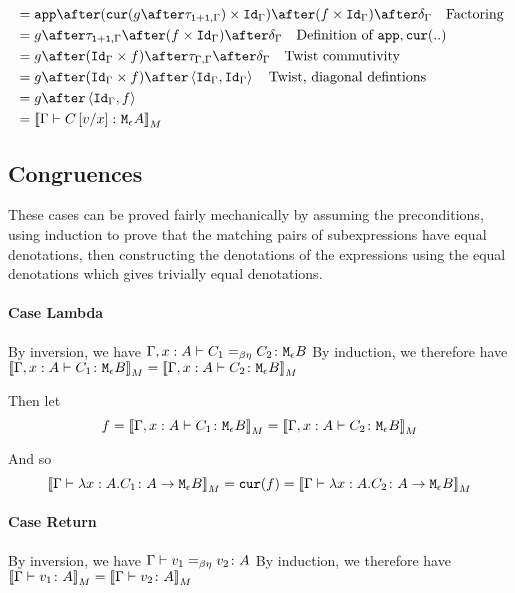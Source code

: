 {\begin{align}
            & = \app\after(\cur{g\after\twist{\1+\1}{\G}}\times \idg)\after (f\times \idg)\after\diag{\G}\qt{Factoring}\\
           & = g\after\twist{\1+\1}{\G} \after (f\times \idg)\after\diag{\G} \qt{Definition of $\app,\cur{..}$}\\
           & = g\after(\idg\times f)\after \twist{\G}{\G} \after\diag{\G} \qt{Twist commutivity}\\
           & = g\after(\idg\times f) \after\pr{\idg}{\idg} \qt{Twist, diagonal defintions} \\
           & = g\after\pr{\idg}{f} \\
           & = \deno{\gtyperelation{C\ssub{x}{v}}{\mea}} \\
        \end{align}






    \subsection{Congruences}
    These cases can be proved fairly mechanically by assuming the preconditions, using induction to prove that the matching pairs of subexpressions have equal denotations, then constructing the denotations of the expressions using the equal denotations which gives trivially equal denotations.

    \paragraph{Case Lambda}
        By inversion, we have $\Gamma, x: A \vdash C_1 =_{\beta\eta} C_2 \colon \texttt{M}_{\epsilon}{B}$
        By induction, we therefore have ${\bf [\![}\Gamma, x: A \vdash C_1 \colon \texttt{M}_{\epsilon}{B}{\bf ]\!]}_M = {\bf [\![}\Gamma, x: A \vdash C_2 \colon \texttt{M}_{\epsilon}{B}{\bf ]\!]}_M$

        Then let
        \begin{equation}
            f = {\bf [\![}\Gamma, x: A \vdash C_1 \colon \texttt{M}_{\epsilon}{B}{\bf ]\!]}_M = {\bf [\![}\Gamma, x: A \vdash C_2 \colon \texttt{M}_{\epsilon}{B}{\bf ]\!]}_M
        \end{equation}

        And so
        \begin{equation}
            {\bf [\![}\Gamma \vdash \lambda x : A. C_1 \colon A \rightarrow \texttt{M}_{\epsilon}{B}{\bf ]\!]}_M = \texttt{cur}(f) = {\bf [\![}\Gamma \vdash \lambda x : A. C_2 \colon A \rightarrow \texttt{M}_{\epsilon}{B}{\bf ]\!]}_M
        \end{equation}


    \paragraph{Case Return}
    By inversion, we have $\Gamma \vdash v_1 =_{\beta\eta} v_2 \colon A$
    By induction, we therefore have ${\bf [\![}\Gamma \vdash v_1 \colon A{\bf ]\!]}_M = {\bf [\![}\Gamma \vdash v_2 \colon A{\bf ]\!]}_M$

}
